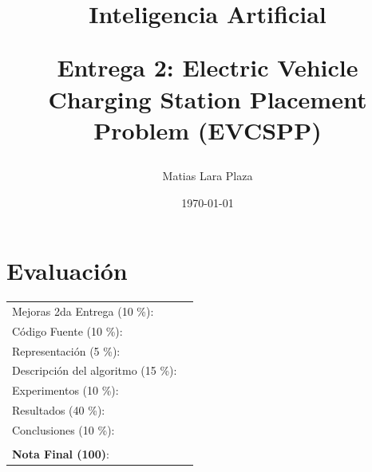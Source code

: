 \documentclass[letter, 10pt]{article}
\begin{document}
\title{Inteligencia Artificial \\ \begin{Large}Entrega 2: Electric Vehicle Charging Station Placement Problem (EVCSPP)\end{Large}}
\author{Matias Lara Plaza}
\date{\today}
\maketitle


\section*{Evaluaci\'on}

\begin{tabular}{ll}
Mejoras 2da Entrega (10 \%): &  \underline{\hspace{2cm}}\\
C\'odigo Fuente (10 \%): &  \underline{\hspace{2cm}}\\
Representaci\'on (5 \%):  & \underline{\hspace{2cm}} \\
Descripci\'on del algoritmo (15 \%):  & \underline{\hspace{2cm}} \\
Experimentos (10 \%):  & \underline{\hspace{2cm}} \\
Resultados (40 \%):  & \underline{\hspace{2cm}} \\
Conclusiones (10 \%): &  \underline{\hspace{2cm}}\\
 &  \\
\textbf{Nota Final (100)}:   & \underline{\hspace{2cm}}
\end{tabular}
\vspace{2cm}
\end{document}
